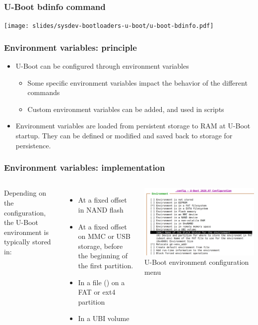 \begin{frame}
  \frametitle{U-Boot bdinfo command}
  \texttt{[image: slides/sysdev-bootloaders-u-boot/u-boot-bdinfo.pdf]}
\end{frame}

\begin{frame}
  \frametitle{Environment variables: principle}
  \begin{itemize}
  \item U-Boot can be configured through environment variables
    \begin{itemize}
    \item Some specific environment variables impact the behavior of
      the different commands
    \item Custom environment variables can be added, and used in
      scripts
    \end{itemize}
  \item Environment variables are loaded from persistent storage to RAM at U-Boot
    startup. They can be defined or modified and saved back to storage
    for persistence.
  \end{itemize}
\end{frame}

\begin{frame}
  \frametitle{Environment variables: implementation}
  \begin{columns}
    Depending on the configuration, the U-Boot environment is typically stored in:
    \begin{itemize}
	  \item At a fixed offset in NAND flash
	  \item At a fixed offset on MMC or USB storage, before the beginning of
                the first partition.
	  \item In a file () on a FAT or ext4 partition
	  \item In a UBI volume
    \end{itemize}
    \includegraphics[width=\textwidth]{slides/sysdev-bootloaders-u-boot/u-boot-environment-configuration.png}\\
    \vspace{0.3cm}
    \tiny U-Boot environment configuration menu
  \end{columns}
\end{frame}

